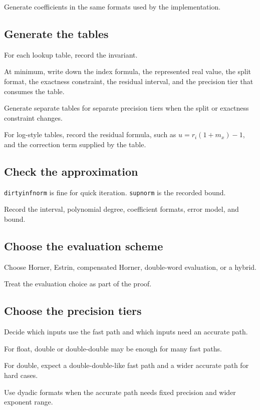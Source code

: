 \documentclass[manuscript, nonacm]{acmart}
\begin{document}
  Generate coefficients in the same formats used by the implementation.

  \subsection{Generate the tables}

  For each lookup table, record the invariant.

  At minimum, write down the index formula, the represented real value, the
  split format, the exactness constraint, the residual interval, and the
  precision tier that consumes the table.

  Generate separate tables for separate precision tiers when the split or
  exactness constraint changes.

  For log-style tables, record the residual formula, such as
  $u = r_i(1 + m_x) - 1$, and the correction term supplied by the table.

  \subsection{Check the approximation}

  \texttt{dirtyinfnorm} is fine for quick iteration.  \texttt{supnorm} is the
  recorded bound.

  Record the interval, polynomial degree, coefficient formats, error model,
  and bound.

  \subsection{Choose the evaluation scheme}

  Choose Horner, Estrin, compensated Horner, double-word evaluation, or a
  hybrid.

  Treat the evaluation choice as part of the proof.

  \subsection{Choose the precision tiers}

  Decide which inputs use the fast path and which inputs need an accurate path.

  For float, double or double-double may be enough for many fast paths.

  For double, expect a double-double-like fast path and a wider accurate path
  for hard cases.

  Use dyadic formats when the accurate path needs fixed precision and wider
  exponent range.
\end{document}
